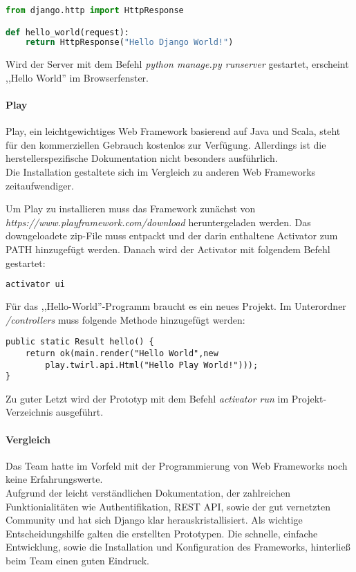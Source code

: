 \begin{lstlisting}[caption={Django Hello-World \cite{DJANGOCODE}}, language=Python]
from django.http import HttpResponse

def hello_world(request):
	return HttpResponse("Hello Django World!")
\end{lstlisting}

Wird der Server mit dem Befehl \textit{python manage.py runserver} gestartet, erscheint ,,Hello World'' im Browserfenster.

\paragraph{Play}
Play, ein leichtgewichtiges Web Framework basierend auf Java und Scala, steht für den kommerziellen Gebrauch kostenlos zur Verfügung. Allerdings ist die herstellerspezifische Dokumentation nicht besonders ausführlich.\\
Die Installation gestaltete sich im Vergleich zu anderen Web Frameworks zeitaufwendiger.\cite{PLAY}

Um Play zu installieren muss das Framework zunächst von\\
\textit{https://www.playframework.com/download} heruntergeladen werden. Das downgeloadete zip-File muss entpackt und der darin enthaltene Activator zum PATH hinzugefügt werden. Danach wird der Activator mit folgendem Befehl gestartet\cite{PLAYCON}:
\begin{lstlisting}[caption={Konifiguration von Play \cite{PLAYCON}}, language=bash]
activator ui
\end{lstlisting}

Für das ,,Hello-World''-Programm braucht es ein neues Projekt. Im Unterordner \textit{/controllers} muss folgende Methode hinzugefügt werden:

\begin{lstlisting}[caption={Play Hello-World \cite{PLAYCON}}]
public static Result hello() {
	return ok(main.render("Hello World",new
		play.twirl.api.Html("Hello Play World!")));
}
\end{lstlisting}

Zu guter Letzt wird der Prototyp mit dem Befehl \textit{activator run} im Projekt-Verzeichnis ausgeführt.

\paragraph{Vergleich}
Das Team hatte im Vorfeld mit der Programmierung von Web Frameworks noch keine Erfahrungswerte. \\
Aufgrund der leicht verständlichen Dokumentation, der zahlreichen Funktionialitäten wie Authentifikation, REST API, sowie der gut vernetzten Community und hat sich Django klar herauskristallisiert. Als wichtige Entscheidungshilfe galten die erstellten Prototypen. Die schnelle, einfache Entwicklung, sowie die Installation und Konfiguration des Frameworks, hinterließ beim Team einen guten Eindruck.

